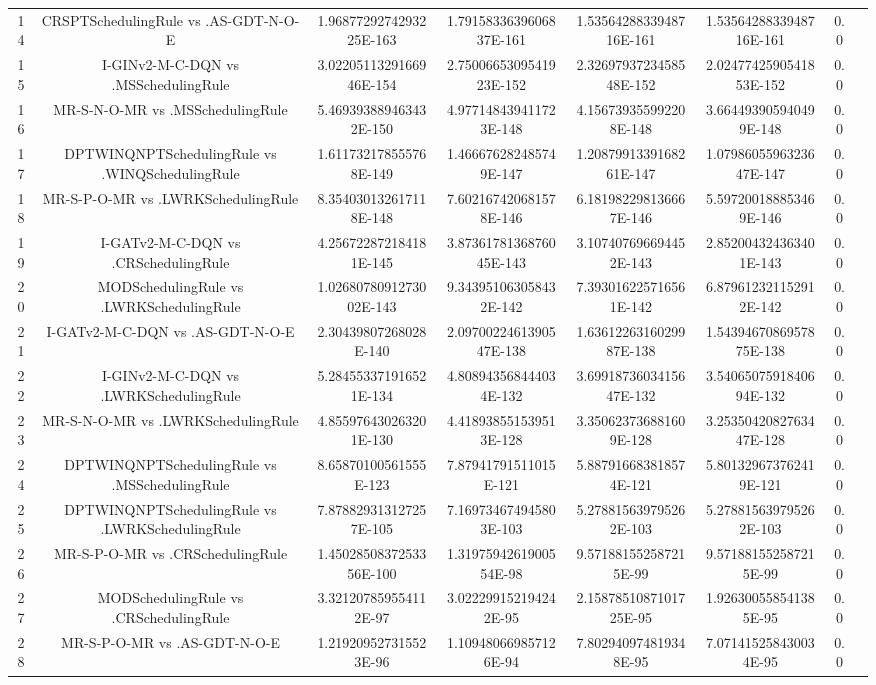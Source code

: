 \documentclass[a3paper,10pt]{article}
\begin{document}
\begin{table}[!htp]
\begin{tabular}{cccccccc}
14&CRSPTSchedulingRule vs .AS-GDT-N-O-E&1.9687729274293225E-163&1.7915833639606837E-161&1.5356428833948716E-161&1.5356428833948716E-161&0.0\\
15&I-GINv2-M-C-DQN vs .MSSchedulingRule&3.0220511329166946E-154&2.7500665309541923E-152&2.3269793723458548E-152&2.0247742590541853E-152&0.0\\
16&MR-S-N-O-MR vs .MSSchedulingRule&5.469393889463432E-150&4.977148439411723E-148&4.156739355992208E-148&3.664493905940499E-148&0.0\\
17&DPTWINQNPTSchedulingRule vs .WINQSchedulingRule&1.611732178555768E-149&1.466676282485749E-147&1.2087991339168261E-147&1.0798605596323647E-147&0.0\\
18&MR-S-P-O-MR vs .LWRKSchedulingRule&8.354030132617118E-148&7.602167420681578E-146&6.181982298136667E-146&5.597200188853469E-146&0.0\\
19&I-GATv2-M-C-DQN vs .CRSchedulingRule&4.256722872184181E-145&3.8736178136876045E-143&3.107407696694452E-143&2.852004324363401E-143&0.0\\
20&MODSchedulingRule vs .LWRKSchedulingRule&1.0268078091273002E-143&9.343951063058432E-142&7.393016225716561E-142&6.879612321152912E-142&0.0\\
21&I-GATv2-M-C-DQN vs .AS-GDT-N-O-E&2.30439807268028E-140&2.0970022461390547E-138&1.6361226316029987E-138&1.5439467086957875E-138&0.0\\
22&I-GINv2-M-C-DQN vs .LWRKSchedulingRule&5.284553371916521E-134&4.808943568444034E-132&3.6991873603415647E-132&3.5406507591840694E-132&0.0\\
23&MR-S-N-O-MR vs .LWRKSchedulingRule&4.855976430263201E-130&4.418938551539513E-128&3.350623736881609E-128&3.2535042082763447E-128&0.0\\
24&DPTWINQNPTSchedulingRule vs .MSSchedulingRule&8.65870100561555E-123&7.87941791511015E-121&5.887916683818574E-121&5.801329673762419E-121&0.0\\
25&DPTWINQNPTSchedulingRule vs .LWRKSchedulingRule&7.878829313127257E-105&7.169734674945803E-103&5.278815639795262E-103&5.278815639795262E-103&0.0\\
26&MR-S-P-O-MR vs .CRSchedulingRule&1.4502850837253356E-100&1.3197594261900554E-98&9.571881552587215E-99&9.571881552587215E-99&0.0\\
27&MODSchedulingRule vs .CRSchedulingRule&3.321207859554112E-97&3.022299152194242E-95&2.1587851087101725E-95&1.926300558541385E-95&0.0\\
28&MR-S-P-O-MR vs .AS-GDT-N-O-E&1.219209527315523E-96&1.109480669857126E-94&7.802940974819348E-95&7.071415258430034E-95&0.0\\

\end{tabular}
\end{table}
\end{document}

